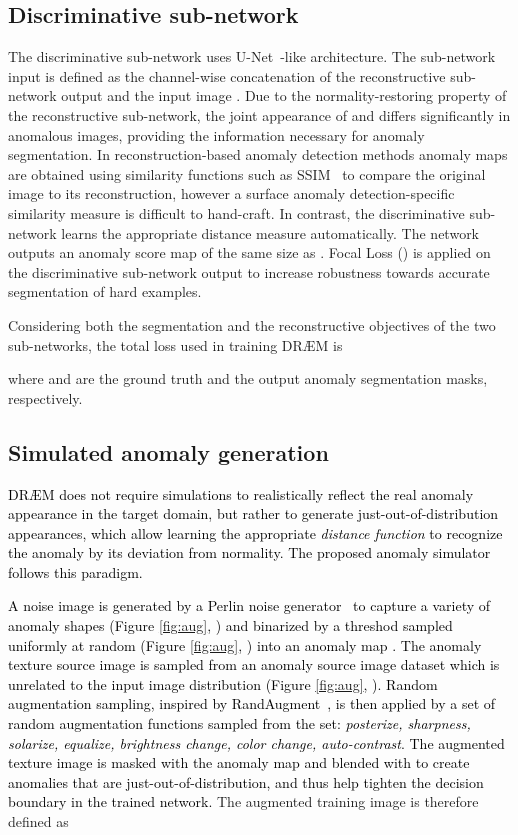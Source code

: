 \documentclass[10pt,twocolumn,letterpaper]{article}
\newcommand\ntext[1]{\textcolor{black}{#1}}
\begin{document}
\subsection{Discriminative sub-network}\label{sec:discriminative}


The discriminative sub-network uses U-Net~\cite{ronneberger2015unet}-like architecture. The sub-network input  is defined as the channel-wise concatenation of the reconstructive sub-network output  and the input image . Due to the normality-restoring property of the reconstructive sub-network, the joint appearance of  and  differs significantly in anomalous images, providing the information necessary for anomaly segmentation. In reconstruction-based anomaly detection methods anomaly maps are obtained using similarity functions such as SSIM~\cite{wang2004image} to compare the original image to its reconstruction, however a surface anomaly detection-specific similarity measure is difficult to hand-craft. In contrast, the discriminative sub-network learns the appropriate distance measure automatically. The network outputs an anomaly score map  of the same size as . Focal Loss \cite{lin2017focal} () is applied on the discriminative sub-network output to increase robustness towards accurate segmentation of hard examples. 

Considering both the segmentation and the reconstructive objectives of the two sub-networks, the total loss used in training DR{\AE}M is

where  and  are the ground truth and the output anomaly segmentation masks, respectively.



\subsection{Simulated anomaly generation}\label{sec:generation}


\ntext{DR{\AE}M does not require simulations to realistically reflect the real anomaly appearance in the target domain, but rather to generate just-out-of-distribution appearances, which allow learning the appropriate \textit{distance function} to recognize the anomaly by its deviation from normality. The proposed anomaly simulator follows this paradigm.}


\ntext{A noise image is generated by a Perlin noise generator~\cite{perlin1985image} to capture a variety of anomaly shapes (Figure \ref{fig:aug}, ) and binarized by a threshod sampled uniformly at random (Figure \ref{fig:aug}, ) into an anomaly map .}
\ntext{The anomaly texture source image  is sampled from an anomaly source image dataset which is unrelated to the input image distribution (Figure \ref{fig:aug}, ).
Random augmentation sampling, inspired by RandAugment~\cite{cubuk2019randaugment}, is then applied by a set of  random augmentation functions sampled from the set: \textit{posterize, sharpness, solarize, equalize, brightness change, color change, auto-contrast}.}
\ntext{The augmented texture image  is masked with the anomaly map  and blended with  to create anomalies that are just-out-of-distribution, and thus help tighten the decision boundary in the trained network.}
The augmented training image  is therefore defined as
\end{document}
